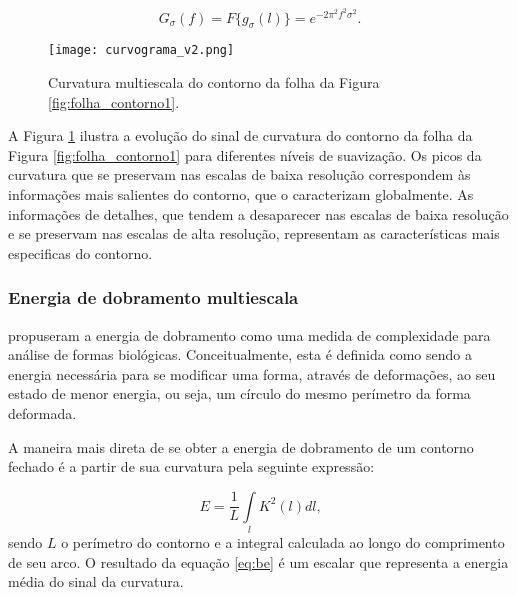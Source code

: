 \begin{equation}
G_\sigma(f) = F\big\{ g_{\sigma}(l)\big\} = e^{-2 \pi^2 f^2 \sigma^2}\text{.}
\end{equation}

\begin{figure}[h!]
  \caption{\label{fig:curv_ms} Curvatura multiescala do contorno da folha da Figura \ref{fig:folha_contorno1}.}
  \centering
  \texttt{[image: curvograma\_v2.png]}
\end{figure}

A Figura \ref{fig:curv_ms} ilustra a evolução do sinal de curvatura do contorno da folha da Figura \ref{fig:folha_contorno1} para diferentes níveis de suavização. Os picos da curvatura que se preservam nas escalas de baixa resolução correspondem às informações mais salientes do contorno, que o caracterizam globalmente. As informações de detalhes, que tendem a desaparecer nas escalas de baixa resolução e se preservam nas escalas de alta resolução, representam as características mais especificas do contorno.

\subsubsection*{Energia de dobramento multiescala\label{subsec:BE}}

 propuseram a energia de dobramento como uma medida de complexidade para análise de formas biológicas. Conceitualmente, esta é definida como sendo a energia necessária para se modificar uma forma, através de deformações, ao seu estado de menor energia, ou seja, um círculo do mesmo perímetro da forma deformada.

A maneira mais direta de se obter a energia de dobramento de um contorno fechado é a partir de sua curvatura pela seguinte expressão:

\begin{equation}\label{eq:be}
E = \frac{1}{L}\int\limits_{l}K^2(l)dl\text{,}
\end{equation}
\noindent
sendo $L$ o perímetro do contorno e a integral calculada ao longo do comprimento de seu arco. O resultado da equação \ref{eq:be} é um escalar que representa a energia média do sinal da curvatura.

\begin{comment}
A energia de dobramento multiescala é obtida a partir da curvatura multiescala repetindo-se o cálculo da equação \ref{eq:be} para diferentes níveis de suavização do contorno. Isso resulta em um vetor de características composto por escalares decorrentes da curvatura multiescala para cada uma das escalas empregadas na suavização do contorno e cálculo da curvatura. 
\end{comment}

